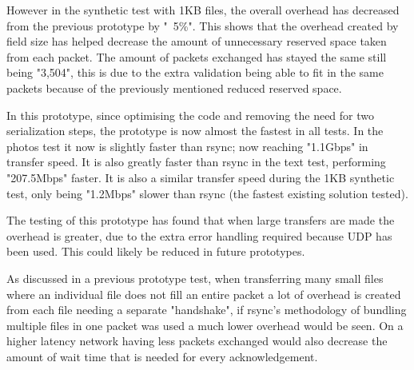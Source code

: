 However in the synthetic test with 1KB files, the overall overhead has decreased from the previous prototype by "~5\%". This shows that the overhead created by field size has helped decrease the amount of unnecessary reserved space taken from each packet. The amount of packets exchanged has stayed the same still being "3,504", this is due to the extra validation being able to fit in the same packets because of the previously mentioned reduced reserved space.

In this prototype, since optimising the code and removing the need for two serialization steps, the prototype is now almost the fastest in all tests. In the photos test it now is slightly faster than rsync; now reaching "1.1Gbps" in transfer speed. It is also greatly faster than rsync in the text test, performing "207.5Mbps" faster. It is also a similar transfer speed during the 1KB synthetic test, only being "1.2Mbps" slower than rsync (the fastest existing solution tested).

The testing of this prototype has found that when large transfers are made the overhead is greater, due to the extra error handling required because UDP has been used. This could likely be reduced in future prototypes.

As discussed in a previous prototype test, when transferring many small files where an individual file does not fill an entire packet a lot of overhead is created from each file needing a separate "handshake", if rsync's methodology of bundling multiple files in one packet was used a much lower overhead would be seen. On a higher latency network having less packets exchanged would also decrease the amount of wait time that is needed for every acknowledgement.
